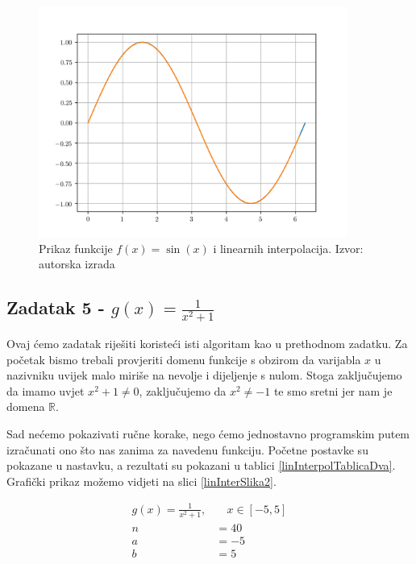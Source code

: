 \documentclass[12pt,a4paper]{report}
\begin{document}
			\begin{figure}[H]
				\centering
				\includegraphics[width=0.9\textwidth]{slike/usporedbaLinearneInterpolacijeSin.png}
				\caption{Prikaz funkcije $f(x)=\sin (x)$ i linearnih interpolacija. Izvor: autorska izrada}
				\label{sinSInterpol}
			\end{figure}
		\subsection{Zadatak 5 - $g(x)=\frac{1}{x^2 +1}$}
			Ovaj ćemo zadatak riješiti koristeći isti algoritam kao u prethodnom zadatku. Za početak bismo trebali provjeriti domenu funkcije s obzirom da varijabla $x$ u nazivniku uvijek malo miriše na nevolje i dijeljenje s nulom. Stoga zaključujemo da imamo uvjet $x^2+1\neq0$, zaključujemo da $x^2\neq-1$ te smo sretni jer nam je domena $\mathbb{R}$.
			
			Sad nećemo pokazivati ručne korake, nego ćemo jednostavno programskim putem izračunati ono što nas zanima za navedenu funkciju. Početne postavke su pokazane u nastavku, a rezultati su pokazani u tablici \ref{linInterpolTablicaDva}. Grafički prikaz možemo vidjeti na slici \ref{linInterSlika2}.
			
			\begin{align*}
			g(x)=\frac{1}{x^2 +1},& \quad x\in [-5,5]\\
			n&=40\\
			a&=-5\\
			b&=5\\
			\end{align*}
			
\end{document}
